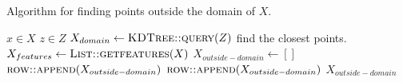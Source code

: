 \begin{algorithm}[H]
  \caption{Algorithm for finding points outside the domain of $X$.}
  \begin{algorithmic}
    \Require $x \in X$  
    \Require $z \in Z$ 
    \State $X_{domain} \gets \Call{KDTree::query}{Z}$ \Comment find the closest points.
    \State $X_{features} \gets \Call{List::getfeatures}{X}$ 
    \State $X_{outside-domain} \gets []$
    \State $\Call{row::append}{X_{outside-domain}}$
    \EndIf
    \State $\Call{row::append}{X_{outside-domain}}$
    \EndIf
    \EndFor
    \State \Return $X_{outside-domain}$ 
  \end{algorithmic}
  \label{alg:find-outside-domain-laplace}
\end{algorithm}